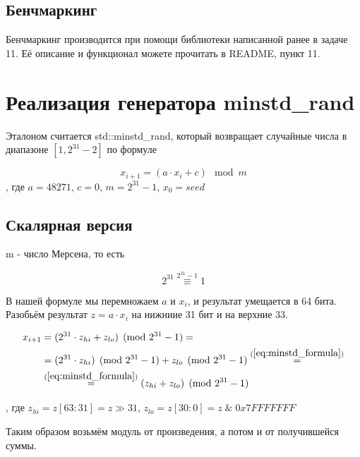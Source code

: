 \documentclass[12pt]{extarticle}
\begin{document}
\subsection{Бенчмаркинг}

Бенчмаркинг производится при помощи библиотеки написанной ранее в задаче 11. Её описание и функционал можете прочитать в README, пункт 11.

\section{Реализация генератора minstd\_rand}

Эталоном считается std::minstd\_rand, который возвращает случайные числа в диапазоне $[1, 2^{31}-2]$ по формуле

\begin{equation}
    \label{eq:minstd_formula}
    x_{i+1} = (a \cdot x_i + c) \mod m
\end{equation}
, где $a = 48271$, $c = 0$, $m = 2^{31} - 1$, $x_0 = seed$

\subsection{Скалярная версия}

m - число Мерсена, то есть

\begin{equation}
    2^{31} \overset{2^{31}-1}{\equiv} 1 
\end{equation}

В нашей формуле мы перемножаем $a$ и $x_i$, и результат умещается в 64 бита. Разобьём результат $z = a \cdot x_i$ на нижниие 31 бит и на верхние 33.

\begin{equation}
\begin{split}
    x_{i+1} &= (2^{31}\cdot z_{hi} + z_{lo}) \pmod{2^{31} - 1} = \\
            &= (2^{31} \cdot z_{hi})\pmod{2^{31} - 1} + z_{lo} \pmod{2^{31} - 1} \overset{(\ref{eq:minstd_formula})}{=}  \\
            &\overset{(\ref{eq:minstd_formula})}{=} (z_{hi} + z_{lo}) \pmod{2^{31} - 1}
\end{split}
\end{equation}

, где $z_{hi} = z[63:31] = z \gg 31$, $z_{lo} = z[30:0] = z\;\&\;0x7FFFFFFF$

Таким образом возьмём модуль от произведения, а потом и от получившейся суммы.
\end{document}

